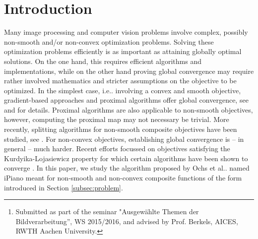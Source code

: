\documentclass[onecolumn,final,a4paper,13pt,reqno]{siamart}
\title{{\TheTitle}}
\author{
  David Stutz\thanks{Submitted as part of the seminar "Ausgew\"ahlte Themen der Bildverarbeitung'', WS 2015/2016, and advised by Prof. Berkels, AICES, RWTH Aachen University.}
}
\makeatletter
\DeclareRobustCommand\onedot{\futurelet\@let@token\@onedot}
\def\@onedot{\ifx\@let@token.\else.\null\fi\xspace}
\def\ie{{i.e}\onedot} \def\Ie{{I.e}\onedot}
\def\etal{{et al}\onedot}
\makeatother
\begin{document}
\maketitle

\begin{abstract}
	This paper studies the minimization of non-convex and non-smooth composite functions. In particular, we discuss the algorithm proposed by Ochs \etal in \cite{OchsChenBroxPock:2013}, called iPiano. Following \cite{OchsChenBroxPock:2013}, we present a global convergence result for functions satisfying the Kurdyka-Lojasiewicz property \cite{Lojasiewicz:1993,Kurdyka:1998} which is based on the work by Attouch \etal~\cite{AttouchBolteSvaiter:2013}. Furthermore, we discuss the implementation of iPiano and apply the algorithm to image denoising and image segmentation. In contrast to \cite{OchsChenBroxPock:2013}, we use simple denoising functionals instead of Fields of Expert \cite{RothBlack:2009,ChenPockRanftlBischof:2013} to demonstrate that simple functionals may benefit from non-smooth and non-convex terms. Finally, we demonstrate the applicability of the algorithm to image segmentation based on a 2-phase field approximation of the Mumford-Shah functional \cite{Shen:2005}.
\end{abstract}

\section{Introduction}

Many image processing and computer vision problems involve complex, possibly non-smooth and/or non-convex optimization problems. Solving these optimization problems efficiently is as important as attaining globally optimal solutions. On the one hand, this requires efficient algorithms and implementations, while on the other hand proving global convergence may require rather involved mathematics and stricter assumptions on the objective to be optimized. In the simplest case, \ie involving a convex and smooth objective, gradient-based approaches and proximal algorithms offer global convergence, see \cite{BoydVandenberghe:2004} and \cite{ParikhBoyd:2014} for details. Proximal algorithms are also applicable to non-smooth objectives, however, computing the proximal map may not necessary be trivial. More recently, splitting algorithms for non-smooth composite objectives have been studied, see \cite{CombettesPesquet:2011}. For non-convex objectives, establishing global convergence is -- in general -- much harder. Recent efforts focussed on objectives satisfying the Kurdyika-Lojasiewicz property \cite{Lojasiewicz:1993,Kurdyka:1998} for which certain algorithms have been shown to converge \cite{AttouchBolteSvaiter:2013}. In this paper, we study the algorithm proposed by Ochs \etal \cite{OchsChenBroxPock:2013} named iPiano meant for non-smooth and non-convex composite functions of the form introduced in Section \ref{subsec:problem}.
\end{document}
